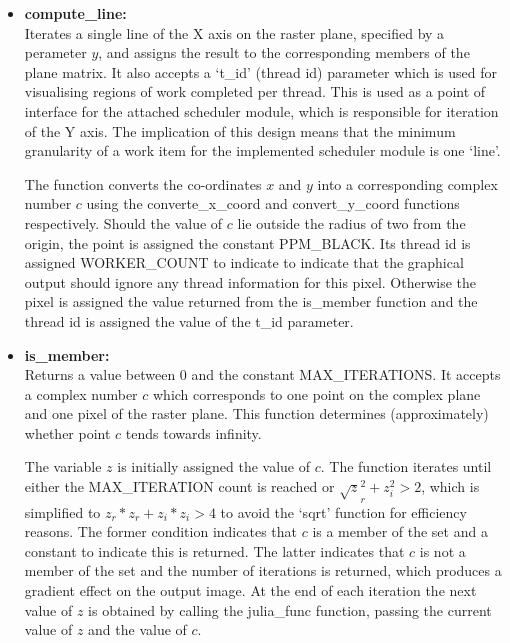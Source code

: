 \begin{itemize}
\item \textbf{compute\_line:} \\
            Iterates a single line of the X axis on the raster plane, specified by a perameter \(y\), and assigns the result to the corresponding
            members of the plane matrix.
            It also accepts a `t\_id' (thread id) parameter which is used for visualising regions of work completed per thread.
            This is used as a point of interface for the attached scheduler module, which is responsible for iteration of the Y axis. 
            The implication of this design means that the minimum granularity of a work item for the implemented scheduler module
            is one `line'.

            The function converts the co-ordinates \(x\) and \(y\) into a corresponding complex number \(c\) using the converte\_x\_coord and 
            convert\_y\_coord functions respectively. 
            Should the value of \(c\) lie outside the radius of two from the origin, the point is 
            assigned the constant PPM\_BLACK. Its thread id is assigned WORKER\_COUNT to indicate to indicate that the graphical output should
            ignore any thread information for this pixel.
            Otherwise the pixel is assigned the value returned from the is\_member function and the thread id is assigned the value of 
            the t\_id parameter.
            
\item \textbf{is\_member:} \\
            Returns a value between 0 and the constant MAX\_ITERATIONS. It accepts a complex number \(c\) which corresponds to one point 
            on the complex plane and one pixel of the raster plane. This function determines (approximately) whether point \(c\) tends towards
            infinity.
            
            The variable \(z\) is initially assigned the value of \(c\). The function iterates until either the MAX\_ITERATION count is reached
            or \(\sqrt z_r^2 + z_i^2 > 2\), which is simplified to \(z_r * z_r + z_i * z_i > 4\) to avoid the `sqrt' function for efficiency
            reasons. The former condition indicates that \(c\) is a member of the set and a constant to indicate this is returned. 
            The latter indicates that \(c\) is not a member of the set and the number of iterations is returned, which produces a gradient 
            effect on the output image. At the end of each iteration the next value of \(z\) is obtained by calling the julia\_func function,
            passing the current value of \(z\) and the value of \(c\).
            

\end{itemize}
